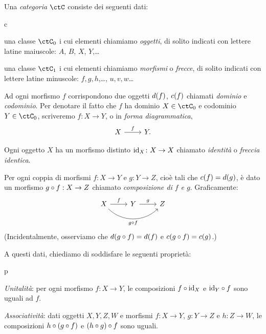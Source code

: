 \begin{definition}[Categoria]\label{def_categ}
	Una \emph{categoria} \(\ctC\) consiste dei seguenti dati:
	\begin{enumtag}{c}
		\item\label{c_1} una classe \(\ctC_0\) i cui elementi chiamiamo \emph{oggetti}, di solito indicati con lettere latine maiuscole: \(A\), \(B\), \(X\), \(Y\),\dots
		\item\label{c_2} una classe \(\ctC_1\) i cui elementi chiamiamo \emph{morfismi} o \emph{frecce}, di solito indicati con lettere latine minuscole: \(f,g,h\),\dots, \(u,v,w\)\dots
		\item\label{c_3} Ad ogni morfismo \(f\) corrispondono due oggetti \(d(f)\), \(c(f)\) chiamati \emph{dominio} e \emph{codominio}. Per denotare il fatto che \(f\) ha dominio \(X\in\ctC_0\) e codominio \(Y\in\ctC_0\), scriveremo \(f\colon X\to Y\), o in \emph{forma diagrammatica},
		\[\begin{tikzcd} X \ar[r, "f"] & Y. \end{tikzcd}\]
		\item\label{c_4} Ogni oggetto \(X\) ha un morfismo distinto \(\mathrm{id}_X\colon X\to X\) chiamato \emph{identità} o \emph{freccia identica}.
		\item\label{c_5} Per ogni coppia di morfismi \(f\colon X\to Y\) e \(g\colon Y\to Z\), cioè tali che \(c(f)=d(g)\), è dato un morfismo \(g\circ f:X\to Z\) chiamato \emph{composizione di \(f\) e \(g\)}. Graficamente:
		\[
			\begin{tikzcd}
				X \ar{r}{f}
				\ar[rounded corners,out=-45, in=225]{rr}[swap]{g\cmp f}
				& Y \ar{r}{g} & Z \\
				&&
			\end{tikzcd}
		\]
		(Incidentalmente, osserviamo che \(d(g\circ f)=d(f)\) e \(c(g\circ f)=c(g)\).)
	\end{enumtag}
	A questi dati, chiediamo di soddisfare le seguenti proprietà:
	\begin{enumtag}{p}
		\item \label{cp_1} \emph{Unitalità}: per ogni morfismo \(f:X\to Y\), le composizioni \(f\circ\mathrm{id}_X\) e \(\mathrm{id}_Y\circ f\) sono uguali ad \(f\).
		\item \label{cp_2} \emph{Associatività}: dati oggetti \(X,Y,Z,W\) e morfismi \(f:X\to Y\), \(g:Y\to Z\) e \(h:Z\to W\), le composizioni \(h\circ (g\circ f)\) e \((h\circ g)\circ f\) sono uguali.
	\end{enumtag}
\end{definition}

